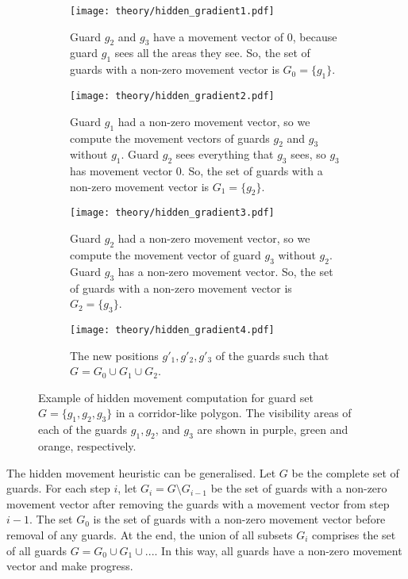 \begin{figure}[h!]
    \centering
    \begin{subfigure}{0.45\textwidth}
        \texttt{[image: theory/hidden\_gradient1.pdf]}
        \caption{Guard $g_2$ and $g_3$ have a movement vector of 0, because guard $g_1$ sees all the areas they see. So, the set of guards with a non-zero movement vector is $G_0 = \{g_1\}$.}
        \label{fig:hidden_gradient1}
    \end{subfigure}
    \hfill
    \begin{subfigure}{0.45\textwidth}
        \texttt{[image: theory/hidden\_gradient2.pdf]}
        \caption{Guard $g_1$ had a non-zero movement vector, so we compute the movement vectors of guards $g_2$ and $g_3$ without $g_1$. Guard $g_2$ sees everything that $g_3$ sees, so $g_3$ has movement vector 0. So, the set of guards with a non-zero movement vector is $G_1 = \{g_2\}$.}
        \label{fig:hidden_gradient2}
    \end{subfigure}
    \begin{subfigure}{0.45\textwidth}
        \texttt{[image: theory/hidden\_gradient3.pdf]}
        \caption{Guard $g_2$ had a non-zero movement vector, so we compute the movement vector of guard $g_3$ without $g_2$. Guard $g_3$ has a non-zero movement vector. So, the set of guards with a non-zero movement vector is $G_2 = \{g_3\}$.}
        \label{fig:hidden_gradient3}
    \end{subfigure}
    \hfill
    \begin{subfigure}{0.45\textwidth}
        \texttt{[image: theory/hidden\_gradient4.pdf]}
        \caption{The new positions $g'_1, g'_2, g'_3$ of the guards such that $G = G_0 \cup G_1 \cup G_2$.}
        \label{fig:hidden_gradient4}
    \end{subfigure}
    \caption{Example of hidden movement computation for guard set $G = \{g_1, g_2, g_3\}$ in a corridor-like polygon. The visibility areas of each of the guards $g_1, g_2$, and $g_3$ are shown in purple, green and orange, respectively.}
    \label{fig:hidden_gradient}
\end{figure}

The hidden movement heuristic can be generalised. Let $G$ be the complete set of guards. For each step $i$, let $G_i = G \setminus G_{i - 1}$ be the set of guards with a non-zero movement vector after removing the guards with a movement vector from step $i - 1$. The set $G_0$ is the set of guards with a non-zero movement vector before removal of any guards. At the end, the union of all subsets $G_i$ comprises the set of all guards $G = G_0 \cup G_1 \cup ...$.
In this way, all guards  have a non-zero movement vector and make progress.

